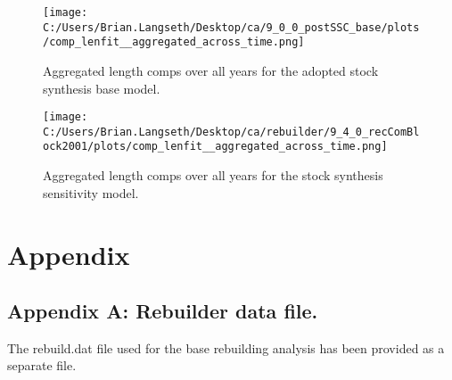 \documentclass[11pt,
  english,
  letterpaper,
]{article}
\begin{document}
\begin{figure}
\centering
\texttt{[image: C:/Users/Brian.Langseth/Desktop/ca/9\_0\_0\_postSSC\_base/plots/comp\_lenfit\_\_aggregated\_across\_time.png]}
\caption{Aggregated length comps over all years for the adopted stock synthesis base model.\label{fig:aggLenFit-base}}
\end{figure}

\tagmcend\tagstructend


\begin{figure}
\centering
\texttt{[image: C:/Users/Brian.Langseth/Desktop/ca/rebuilder/9\_4\_0\_recComBlock2001/plots/comp\_lenfit\_\_aggregated\_across\_time.png]}
\caption{Aggregated length comps over all years for the stock synthesis sensitivity model.\label{fig:aggLenFit-sens}}
\end{figure}

\tagmcend\tagstructend

\clearpage

\clearpage


\hypertarget{appendix}{%
\section{Appendix}\label{appendix}}

\leavevmode\tagmcend\tagstructend


\hypertarget{append_a}{%
\subsection{Appendix A: Rebuilder data file.}\label{append_a}}

\leavevmode\tagmcend\tagstructend


The rebuild.dat file used for the base rebuilding analysis has been provided as a separate file.

\leavevmode\tagmcend\tagstructend\par

\clearpage
\end{document}
